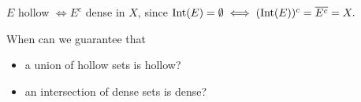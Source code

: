 \begin{rem}
    $E$ hollow $\iff E^c$ dense in $X$, since $\operatorname{Int}(E) = \emptyset \iff
    (\operatorname{Int} (E))^c = \overline{E^c} = X.$  
\end{rem} 

\begin{goal}
    When can we guarantee that 
    \begin{itemize}
        \item a union of hollow sets is hollow?
        \item an intersection of dense sets is dense?
    \end{itemize}

\end{goal}


